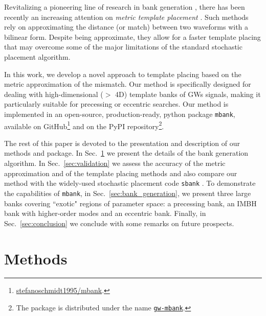 \documentclass[twocolumn,showpacs,preprintnumbers,nofootinbib,prd,
superscriptaddress,10pt]{revtex4-2}
\begin{document}
Revitalizing a pioneering line of research in bank generation \cite{owen_metric, Messenger:2008ta, Prix:2007ks, Brown:2012qf, Keppel:2013uma}, there has been recently an increasing attention on {\it metric template placement} \cite{Roy:2017oul, 2018cosp...42E2899R, Coogan:2022qxs, Hanna:2022zpk}.
Such methods rely on approximating the distance (or match) between two waveforms with a bilinear form. Despite being approximate, they allow for a faster template placing that may overcome some of the major limitations of the standard stochastic placement algorithm.

In this work, we develop a novel approach to template placing based on the metric approximation of the mismatch.
Our method is specifically designed for dealing with high-dimensional ($>$ 4D) template banks of GWs signals, making it particularly suitable for precessing or eccentric searches.
Our method is implemented in an open-source, production-ready, python package \texttt{mbank}, available on GitHub\footnote{
\href{https://github.com/stefanoschmidt1995/mbank}{stefanoschmidt1995/mbank}.}
and on the PyPI repository\footnote{
The package is distributed under the name \texttt{\href{https://pypi.org/project/gw-mbank/}{gw-mbank}}.
}.

The rest of this paper is devoted to the presentation and description of our methods and package.
In Sec.~\ref{sec:methods} we present the details of the bank generation algorithm.
In Sec.~\ref{sec:validation} we assess the accuracy of the metric approximation and of the template placing methods and also compare our method with the widely-used stochastic placement code \texttt{sbank} \cite{Ajith:2012mn}.
To demonstrate the capabilities of \texttt{mbank}, in Sec.~\ref{sec:bank_generation}, we present three large banks covering ``exotic" regions of parameter space: a precessing bank, an IMBH bank with higher-order modes and an eccentric bank.
Finally, in Sec.~\ref{sec:conclusion} we conclude with some remarks on future prospects.

\section{Methods} \label{sec:methods}
\end{document}
